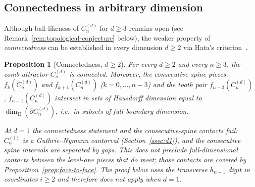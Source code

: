 \documentclass{amsart}
\newtheorem{proposition}[theorem]{Proposition}
\theoremstyle{definition}
\theoremstyle{remark}
\newcommand{\dH}{\dim_{\mathrm{H}}}
\begin{document}
\subsection{Connectedness in arbitrary dimension}
\label{ssec:connectedness}

Although ball-likeness of $C_n^{(d)}$ for $d \ge 3$ remains open
(see Remark~\ref{rem:topological-conjecture} below), the weaker
property of \emph{connectedness} can be established
in every dimension $d \ge 2$ via Hata's criterion~\cite{hata}.

\begin{proposition}[Connectedness, $d \ge 2$]\label{prop:connected}
For every $d \ge 2$ and every $n \ge 3$, the comb attractor
$C_n^{(d)}$ is connected.  Moreover, the consecutive spine pieces
$f_k(C_n^{(d)})$ and $f_{k+1}(C_n^{(d)})$ ($k = 0, \ldots, n{-}3$)
and the tooth pair $f_{n-2}(C_n^{(d)})$, $f_{n-1}(C_n^{(d)})$
intersect in sets of Hausdorff dimension equal to
$\dH(\partial C_n^{(d)})$, i.e.\ in subsets of full boundary
dimension.

At $d = 1$ the connectedness statement and the consecutive-spine
contacts fail: $C_n^{(1)}$ is a Guthrie--Nymann cantorval
(Section~\ref{ssec:d1}), and the consecutive spine intervals are
separated by gaps.  This does not preclude full-dimensional contacts
between the level-one pieces that do meet; those contacts are covered
by Proposition~\ref{prop:face-to-face}.
The proof below uses the transverse $h_{n-1}$ digit in coordinates
$i \ge 2$ and therefore does not apply when $d = 1$.
\end{proposition}
\end{document}
